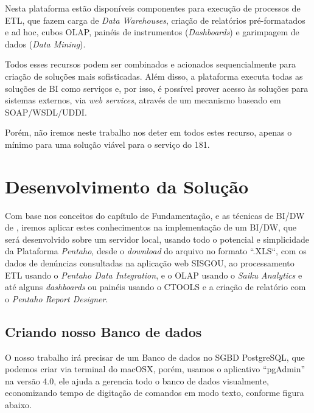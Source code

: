 Nesta plataforma est\~{a}o dispon\'{i}veis componentes para execu\c{c}\~{a}o de processos de ETL, que fazem 
carga de \textit{Data Warehouses}, cria\c{c}\~{a}o de relat\'orios pr\'{e}-formatados e ad hoc, cubos OLAP, 
pain\'{e}is de instrumentos (\textit{Dashboards}) e garimpagem de dados (\textit{Data Mining}). 

Todos esses recursos podem ser combinados e acionados sequencialmente para cria\c{c}\~{a}o de solu\c{c}\~{o}es 
mais sofisticadas. Al\'{e}m disso, a plataforma executa todas as solu\c{c}\~{o}es de BI como servi\c{c}os e, 
por isso, \'{e} poss\'{i}vel prover acesso \`{a}s solu\c{c}\~{o}es para sistemas externos, via 
\textit{web services}, atrav\'{e}s de um mecanismo baseado em SOAP/WSDL/UDDI.

Por\'{e}m, n\~{a}o iremos neste trabalho nos deter em todos estes recurso, apenas o m\'{i}nimo para 
uma solu\c{c}\~{a}o vi\'{a}vel para o servi\c{c}o do 181.


\section{Desenvolvimento da Solu\c{c}\~{a}o}

Com base nos conceitos do cap\'{i}tulo de Fundamenta\c{c}\~{a}o, e as t\'{e}cnicas de BI/DW de \cite{dw-kimball-2013}, 
iremos aplicar estes conhecimentos na implementa\c{c}\~{a}o de um BI/DW, que ser\'{a} desenvolvido 
sobre um servidor local, usando todo o potencial e simplicidade da Plataforma \textit{Pentaho}, desde o \textit{download} 
do arquivo no formato ``.XLS``, com os dados de denúncias consultadas na aplica\c{c}\~{a}o web SISGOU, ao 
processamento ETL usando o \textit{Pentaho Data Integration}, e o OLAP usando o \textit{Saiku Analytics} e at\'{e} alguns 
\textit{dashboards} ou pain\'{e}is usando o CTOOLS e a cria\c{c}\~{a}o de relat\'orio com o \textit{Pentaho Report Designer}.

\subsection{Criando nosso Banco de dados}

O nosso trabalho ir\'{a} precisar de um Banco de dados no SGBD PostgreSQL, que podemos 
criar via terminal do macOSX, por\'{e}m, usamos o aplicativo ``pgAdmin'' na versão 4.0, ele 
ajuda a gerencia todo o banco de dados visualmente, economizando tempo de digita\c{c}\~{a}o de comandos em modo texto, conforme figura abaixo.

